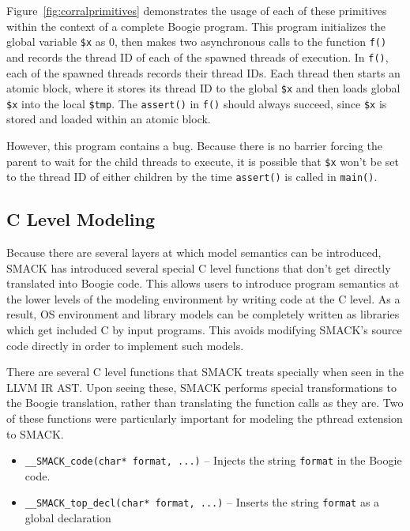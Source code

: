 Figure~\ref{fig:corralprimitives} demonstrates the usage of each of
these primitives within the context of a complete Boogie program.
This program initializes the global variable \lstinline|$x| as 0, then
makes two asynchronous calls to the function \lstinline|f()| and
records the thread ID of each of the spawned threads of execution.  In
\lstinline|f()|, each of the spawned threads records their thread IDs.
Each thread then starts an atomic block, where it stores its thread ID
to the global \lstinline|$x| and then loads global \lstinline|$x| into
the local \lstinline|$tmp|.  The \lstinline|assert()| in
\lstinline|f()| should always succeed, since \lstinline|$x| is stored
and loaded within an atomic block. 

However, this program contains a bug.  Because there is no barrier
forcing the parent to wait for the child threads to execute, it is
possible that \lstinline|$x| won't be set to the thread ID of either
children by the time \lstinline|assert()| is called in
\lstinline|main()|.

\subsection{C Level Modeling}\label{sec:clevelmodeling}
Because there are several layers at which model semantics can be
introduced, SMACK has introduced several special C level functions 
that don't get directly translated into Boogie code.  This allows
users to introduce program semantics at the lower levels of the
modeling environment by writing code at the C level.  As a result, OS
environment and library models can be completely written as libraries
which get included C by input programs.  This avoids modifying SMACK's
source code directly in order to implement such models.

There are several C level functions that SMACK treats specially when
seen in the LLVM IR AST.  Upon seeing these, SMACK performs special
transformations to the Boogie translation, rather than translating the
function calls as they are.  Two of these functions were particularly
important for modeling the pthread extension to SMACK.

\begin{itemize}
\item \lstinline|__SMACK_code(char* format, ...)| -- Injects the
  string \lstinline|format| in the Boogie code.
\item \lstinline|__SMACK_top_decl(char* format, ...)| -- Inserts the
  string \lstinline|format| as a global declaration 
\end{itemize}

